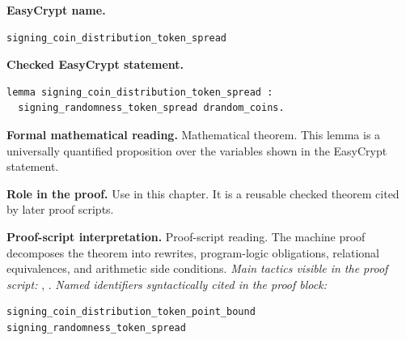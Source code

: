 \begin{formaltheorem}
\noindent\textbf{EasyCrypt name.}
\begin{lstlisting}[language=EasyCrypt,basicstyle=\ttfamily\scriptsize]
signing_coin_distribution_token_spread
\end{lstlisting}
\noindent\textbf{Checked EasyCrypt statement.}
\begin{lstlisting}[language=EasyCrypt,basicstyle=\ttfamily\scriptsize]
lemma signing_coin_distribution_token_spread :
  signing_randomness_token_spread drandom_coins.
\end{lstlisting}
\noindent\textbf{Formal mathematical reading.}
Mathematical theorem. This lemma is a universally quantified proposition over the variables shown in the EasyCrypt statement.

\noindent\textbf{Role in the proof.}
Use in this chapter. It is a reusable checked theorem cited by later proof scripts.

\noindent\textbf{Proof-script interpretation.}
Proof-script reading. The machine proof decomposes the theorem into rewrites, program-logic obligations, relational equivalences, and arithmetic side conditions.
\emph{Main tactics visible in the proof script:} , .
\emph{Named identifiers syntactically cited in the proof block:}
\begin{lstlisting}[language=EasyCrypt,basicstyle=\ttfamily\scriptsize]
signing_coin_distribution_token_point_bound
signing_randomness_token_spread
\end{lstlisting}

\end{formaltheorem}

